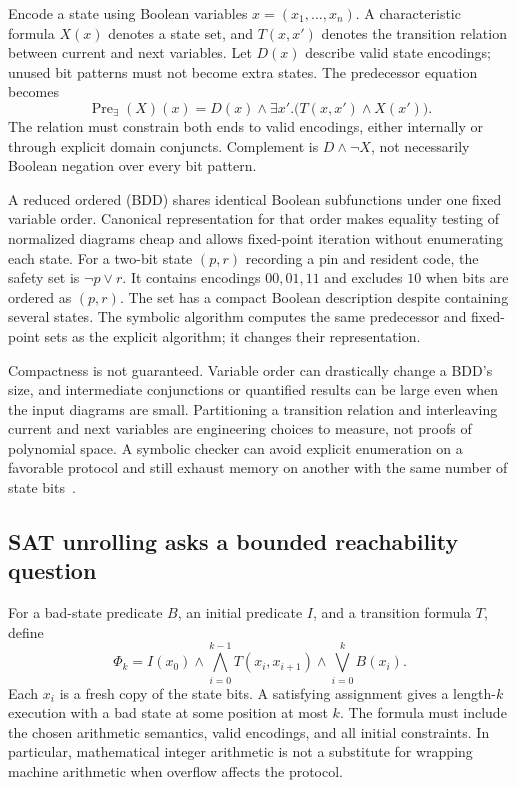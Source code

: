 Encode a state using Boolean variables $x=(x_1,\ldots,x_n)$.
A characteristic formula $X(x)$ denotes a state set, and $T(x,x')$ denotes the transition relation between current and next variables.
Let $D(x)$ describe valid state encodings; unused bit patterns must not become extra states.
The predecessor equation becomes
\[
 \operatorname{Pre}_{\exists}(X)(x)
 =D(x)\land\exists x'.\bigl(T(x,x')\land X(x')\bigr).
\]
The relation must constrain both ends to valid encodings, either internally or through explicit domain conjuncts.
Complement is $D\land\neg X$, not necessarily Boolean negation over every bit pattern.

A reduced ordered  (BDD) shares identical Boolean subfunctions under one fixed variable order.
Canonical representation for that order makes equality testing of normalized diagrams cheap and allows fixed-point iteration without enumerating each state.
For a two-bit state $(p,r)$ recording a pin and resident code, the safety set is $\neg p\lor r$.
It contains encodings $00,01,11$ and excludes $10$ when bits are ordered as $(p,r)$.
The set has a compact Boolean description despite containing several states.
The symbolic algorithm computes the same predecessor and fixed-point sets as the explicit algorithm; it changes their representation.

Compactness is not guaranteed.
Variable order can drastically change a BDD's size, and intermediate conjunctions or quantified results can be large even when the input diagrams are small.
Partitioning a transition relation and interleaving current and next variables are engineering choices to measure, not proofs of polynomial space.
A symbolic checker can avoid explicit enumeration on a favorable protocol and still exhaust memory on another with the same number of state bits~\cite{clarke-2018-handbook}.

\subsection{SAT unrolling asks a bounded reachability question}
\label{sec:ch46-bmc}

For a bad-state predicate $B$, an initial predicate $I$, and a transition formula $T$, define
\[
 \Phi_k=I(x_0)\land
       \bigwedge_{i=0}^{k-1}T(x_i,x_{i+1})\land
       \bigvee_{i=0}^{k}B(x_i).
\]
Each $x_i$ is a fresh copy of the state bits.
A satisfying assignment gives a length-$k$ execution with a bad state at some position at most $k$.
The formula must include the chosen arithmetic semantics, valid encodings, and all initial constraints.
In particular, mathematical integer arithmetic is not a substitute for wrapping machine arithmetic when overflow affects the protocol.


